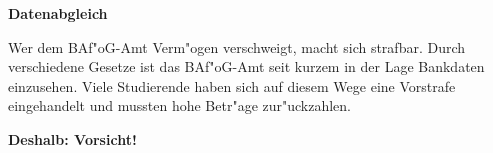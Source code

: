 \textbf{\LARGE Datenabgleich}
\vspace*{1ex}


Wer dem BAf"oG-Amt Verm"ogen verschweigt, macht sich strafbar. Durch verschiedene Gesetze ist das BAf"oG-Amt seit kurzem in der Lage Bankdaten einzusehen. Viele Studierende haben sich auf diesem Wege eine Vorstrafe eingehandelt und mussten hohe Betr"age zur"uckzahlen.

\textbf{Deshalb: Vorsicht!}
